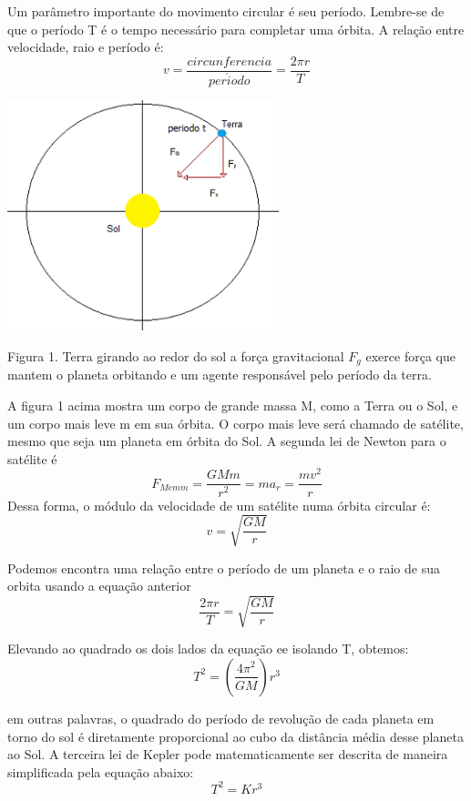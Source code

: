 \documentclass[a4paper]{article} %
\begin{document}
Um parâmetro importante do movimento circular é seu período. Lembre-se de que o período T é o tempo necessário para completar uma órbita. A relação entre velocidade, raio e período é:
\[v = \frac{circunferencia}{per\acute{i}odo} = \frac{2\pi r}{T} \]

\begin{center}
	\includegraphics[width=3.10in,height=2.64in,keepaspectratio = false]{image2.png}
	
	\scriptsize Figura 1. Terra girando ao redor do sol a força gravitacional $F_g$ exerce força que mantem o planeta orbitando e um agente responsável pelo período da terra. 
	
\end{center}

A figura 1 acima mostra um corpo de grande massa M, como a Terra ou o Sol, e um corpo mais leve m em sua órbita. O corpo mais leve será chamado de satélite, mesmo que seja um planeta em órbita do Sol. A segunda lei de Newton para o satélite é
\[F_{M em m} = \frac{GMm}{r^2} = ma_r = \frac{mv^2}{r}\]
Dessa forma, o módulo da velocidade de um satélite numa órbita circular é:
\[v = \sqrt{\frac{GM}{r}}\]

Podemos encontra uma relação entre o período de um planeta e o raio de sua orbita usando a equação anterior
\[\frac{2\pi{r}}{T} = \sqrt{\frac{GM}{r}}\]

Elevando ao  quadrado os dois lados da equação ee isolando T, obtemos:
\begin{equation}
	T^2 = \left(\frac{4\pi^2}{GM}\right)r^3
\end{equation}

em outras palavras, o quadrado do período de revolução de cada planeta em torno do sol é diretamente proporcional ao cubo da distância média desse planeta ao Sol.
A terceira lei de Kepler pode matematicamente ser descrita de maneira simplificada pela equação abaixo:
\[T^2 = Kr^3\]
\end{document}
